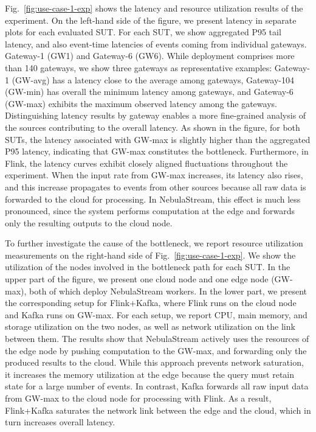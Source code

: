 \documentclass[runningheads]{llncs}
\begin{document}
Fig.~\ref{fig:use-case-1-exp} shows the latency and resource utilization results of the experiment. 
On the left-hand side of the figure, we present latency in separate plots for each evaluated SUT. 
For each SUT, we show aggregated P95 tail latency, and also event-time latencies of events coming from individual gateways. Gateway-1 (GW1) and Gateway-6 (GW6). 
While deployment comprises more than 140 gateways, we show three gateways as representative examples: Gateway-1 (GW-avg) has a latency close to the average among gateways, Gateway-104 (GW-min) has overall the minimum latency among gateways, and Gateway-6 (GW-max) exhibits the maximum observed latency among the gateways. 
Distinguishing latency results by gateway enables a more fine-grained analysis of the sources contributing to the overall latency. 
As shown in the figure, for both SUTs, the latency associated with GW-max is slightly higher than the aggregated P95 latency, indicating that GW-max constitutes the bottleneck. 
Furthermore, in Flink, the latency curves exhibit closely aligned fluctuations throughout the experiment. 
When the input rate from GW-max increases, its latency also rises, and this increase propagates to events from other sources because all raw data is forwarded to the cloud for processing. 
In NebulaStream, this effect is much less pronounced, since the system performs computation at the edge and forwards only the resulting outputs to the cloud node. 

To further investigate the cause of the bottleneck, we report resource utilization measurements on the right-hand side of Fig.~\ref{fig:use-case-1-exp}. 
We show the utilization of the nodes involved in the bottleneck path for each SUT. 
In the upper part of the figure, we present one cloud node and one edge node (GW-max), both of which deploy NebulaStream workers. 
In the lower part, we present the corresponding setup for Flink+Kafka, where Flink runs on the cloud node and Kafka runs on GW-max. 
For each setup, we report CPU, main memory, and storage utilization on the two nodes, as well as network utilization on the link between them. 
The results show that NebulaStream actively uses the resources of the edge node by pushing computation to the GW-max, and forwarding only the produced results to the cloud. 
While this approach prevents network saturation, it increases the memory utilization at the edge because the query must retain state for a large number of events.
In contrast, Kafka forwards all raw input data from GW-max to the cloud node for processing with Flink. 
As a result, Flink+Kafka saturates the network link between the edge and the cloud, which in turn increases overall latency. 
\end{document}
